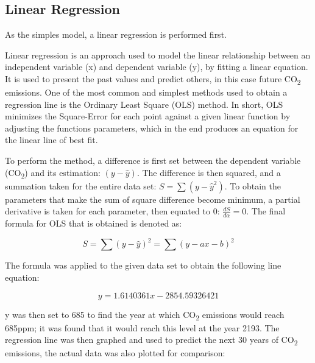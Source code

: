 \documentclass{mcmthesis}
\begin{document}
    \subsection{Linear Regression}
    As the simples model, a linear regression is performed first.

    Linear regression is an approach used to model the linear relationship between an independent variable (x) and dependent variable (y), by fitting a linear equation. It is used to present the past values and predict others, in this case future CO\textsubscript{2} emissions. One of the most common and simplest methods used to obtain a regression line is the Ordinary Least Square (OLS) method. In short, OLS minimizes the Square-Error for each point against a given linear function by adjusting the function\textquotesingle s parameters, which in the end produces an equation for the linear line of best fit.

    To perform the method, a difference is first set between the dependent variable (CO\textsubscript{2}) and its estimation: ${(y - \hat{y})}$. The difference is then squared, and a summation taken for the entire data set: ${\displaystyle S = \sum (y - \hat{y}^2)}$. To obtain the parameters that make the sum of square difference become minimum, a partial derivative is taken for each parameter, then equated to 0: $\displaystyle \frac{d S}{d \alpha} = 0$. The final formula for OLS that is obtained is denoted as:

    \begin{equation}
        S = \sum{(y - \hat{y})^2} = \sum{(y - ax - b)^2}
        \label{eq:ols}
    \end{equation}


    The formula was applied to the given data set to obtain the following line equation:

    \begin{equation}
        y = 1.6140361 x - 2854.59326421
        \label{eq:co2_lr}
    \end{equation}

    {y} was then set to 685 to find the year at which CO\textsubscript{2} emissions would reach 685ppm; it was found that it would reach this level at the year 2193. The regression line was then graphed and used to predict the next 30 years of CO\textsubscript{2} emissions, the actual data was also plotted for comparison:
\end{document}
